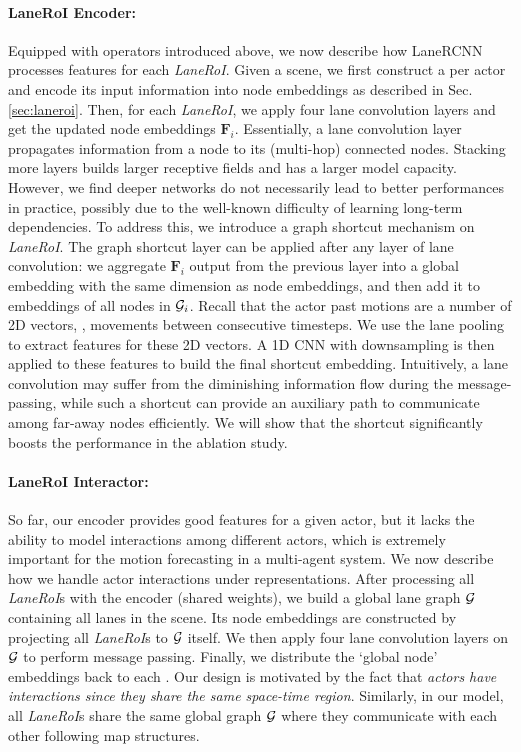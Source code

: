 \paragraph{LaneRoI Encoder:}
Equipped with operators introduced above, we now describe how LaneRCNN processes
features for each \textit{LaneRoI}. Given a scene, we first
construct a \ROI per actor and encode its input information into node
embeddings as described in Sec. \ref{sec:laneroi}. Then, for each \textit{LaneRoI}, we apply
four lane convolution layers and get the updated node embeddings
$\mathbf{F}_i$.
Essentially, a lane convolution layer propagates information from a node to
its (multi-hop) connected nodes. Stacking more layers builds larger receptive
fields and has a larger model capacity. However, we find deeper
networks do not necessarily lead to better performances in practice, possibly due to the well-known
difficulty of learning long-term dependencies. To address this, we introduce a
graph shortcut mechanism on \textit{LaneRoI}. 
The graph shortcut layer can be applied after any layer of lane convolution:
we aggregate $\mathbf{F}_i$ output from the previous layer into a global
embedding with the same dimension as node embeddings, and then add it to embeddings
of all nodes in $\mathcal{G}_i$.
Recall that the actor past motions are a number of 2D vectors, \ie, movements
between consecutive timesteps. We use the lane pooling to extract
features for these 2D vectors. A 1D CNN with downsampling is then applied to these features to
build the final shortcut embedding. Intuitively, a lane convolution may suffer
from the diminishing information flow during the message-passing, while such
a shortcut can provide an auxiliary path to communicate among far-away nodes
efficiently. We will show that the shortcut significantly boosts the performance in the ablation study.



\paragraph{LaneRoI Interactor:}
So far, our \ROI encoder provides good features for a given actor, but it
lacks the ability to model interactions among different actors, which is
extremely important for the motion forecasting in a multi-agent system. We now
describe  how we handle actor interactions under \ROI representations.
After processing all \textit{LaneRoI}s with the \ROI encoder (shared weights), we build a global lane graph
$\mathcal{G}$ containing all lanes in the scene. Its node embeddings are constructed by
projecting all \textit{LaneRoI}s to $\mathcal{G}$ itself. We then apply four lane convolution layers on $\mathcal{G}$ to perform message passing. Finally, we distribute the
`global node' embeddings back to each \ROI. Our design is motivated by the fact
that \textit{actors have interactions since they share the same space-time region}. Similarly,
in our model, all \textit{LaneRoI}s share the same global graph $\mathcal{G}$ where
they communicate with each other following map structures. 


